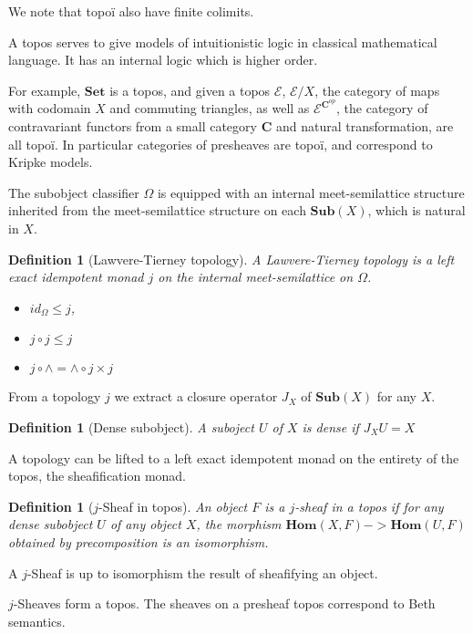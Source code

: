 \documentclass{article}
\newtheorem{definition}[theorem]{Definition}
\newcommand{\0}{\mathbf{0}}
\newcommand{\1}{\mathbf{1}}
\begin{document}
We note that topoï also have finite colimits.

A topos serves to give models of intuitionistic logic in classical mathematical language. It has an internal logic which is higher order.

For example, $\mathbf{Set}$ is a topos, and given a topos $\mathcal E$, $\mathcal{E}/X$, the category of maps with codomain $X$ and commuting triangles, as well as $\mathcal{E}^{\mathbf{C}^{op}}$, the category of contravariant functors from a small category $\mathbf{C}$ and natural transformation, are all topoï. In particular categories of presheaves are topoï, and correspond to Kripke models. 

The subobject classifier $\Omega$ is equipped with an internal meet-semilattice structure inherited from the meet-semilattice structure on each $\mathbf{Sub}(X)$, which is natural in $X$.

\begin{definition}[Lawvere-Tierney topology]
    A \emph{Lawvere-Tierney topology} is a left exact idempotent monad $j$ on the internal meet-semilattice on $\Omega$.
\begin{itemize}
    \item $ id_\Omega \leq j $,
    \item $ j\circ j \leq  j$
    \item $ j \circ \wedge = \wedge \circ j\times j$
\end{itemize}
\end{definition}

From a topology $j$ we extract a closure operator $J_X$ of $\mathbf{Sub}(X)$ for any $X$.
\begin{definition}[Dense subobject]
    A suboject $U$ of $X$ is dense if $J_XU  = X$
\end{definition}

A topology can be lifted to a left exact idempotent monad on the entirety of the topos, the sheafification monad.

\begin{definition}[$j$-Sheaf in topos]
    An object $F$ is a $j$-\emph{sheaf} in a topos if for any dense subobject $U$ of any object $X$, the morphism $\mathbf{Hom}(X, F) -> \mathbf{Hom}(U, F)$ obtained by precomposition is an isomorphism.
\end{definition}

A $j$-Sheaf is up to isomorphism the result of sheafifying an object.

$j$-Sheaves form a topos. The sheaves on a presheaf topos correspond to Beth semantics.
\end{document}
